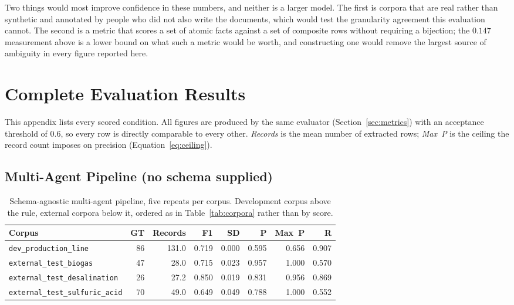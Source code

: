 \documentclass[11pt]{article}
\begin{document}
Two things would most improve confidence in these numbers, and neither is a
larger model. The first is corpora that are real rather than synthetic and
annotated by people who did not also write the documents, which would test the
granularity agreement this evaluation cannot. The second is a metric that scores
a set of atomic facts against a set of composite rows without requiring a
bijection; the $0.147$ measurement above is a lower bound on what such a metric
would be worth, and constructing one would remove the largest source of
ambiguity in every figure reported here.


\appendix
\section{Complete Evaluation Results}
\label{app:full_results}

This appendix lists every scored condition. All figures are produced by the
same evaluator (Section~\ref{sec:metrics}) with an acceptance threshold of
$0.6$, so every row is directly comparable to every other. \emph{Records} is the
mean number of extracted rows; \emph{Max~P} is the ceiling the record count
imposes on precision (Equation~\ref{eq:ceiling}).

\subsection*{Multi-Agent Pipeline (no schema supplied)}
\begin{table}[H]\centering
\caption{Schema-agnostic multi-agent pipeline, five repeats per corpus.
Development corpus above the rule, external corpora below it, ordered as in
Table~\ref{tab:corpora} rather than by score.}
\label{tab:app_multiagent}
\small\begin{tabular}{@{}lrrrrrrr@{}}\toprule
\textbf{Corpus} & \textbf{GT} & \textbf{Records} & \textbf{F1} & \textbf{SD} & \textbf{P} & \textbf{Max~P} & \textbf{R} \\ \midrule
\texttt{dev\_production\_line} & 86 & 131.0 & 0.719 & 0.000 & 0.595 & 0.656 & 0.907 \\
\midrule
\texttt{external\_test\_biogas} & 47 & 28.0 & 0.715 & 0.023 & 0.957 & 1.000 & 0.570 \\
\texttt{external\_test\_desalination} & 26 & 27.2 & 0.850 & 0.019 & 0.831 & 0.956 & 0.869 \\
\texttt{external\_test\_sulfuric\_acid} & 70 & 49.0 & 0.649 & 0.049 & 0.788 & 1.000 & 0.552 \\
\bottomrule\end{tabular}\end{table}
\end{document}
